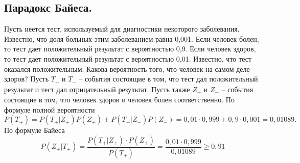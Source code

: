 \subsection{Парадокс Байеса.}
Пусть иеется тест, используемый для диагностики некоторого заболевания. Известно, что доля больных этим заболеванием равна 0,001. Если человек болен, то тест дает положительный результат с вероятностью 0,9. Если человек здоров, то тест дает положительный результат с вероятностью 0,01. Известно, что тест оказался положительным. Какова вероятность того, что человек на самом деле здоров?
Пусть $T_+$ и $T_-$ -- события состоящие в том, что тест дал положительный результат и тест дал отрицательный результат. Пусть также $Z_+$ и $Z_-$ -- события состоящие в том, что человек здоров и человек болен соответственно. По формуле полной вероятности
$$P(T_+) = P(T_+|Z_+)P(Z_+) + P(T_+|Z_-)P(Z_-) = 0,01 \cdot 0,999 + 0,9 \cdot 0,001 = 0,01089.$$
По формуле Байеса
$$P(Z_+|T_+) = \frac{P(T_+|Z_+) \cdot P(Z_+)}{P(T_+)} = \frac{0,01 \cdot 0,999}{0,01089} \geq 0,91$$